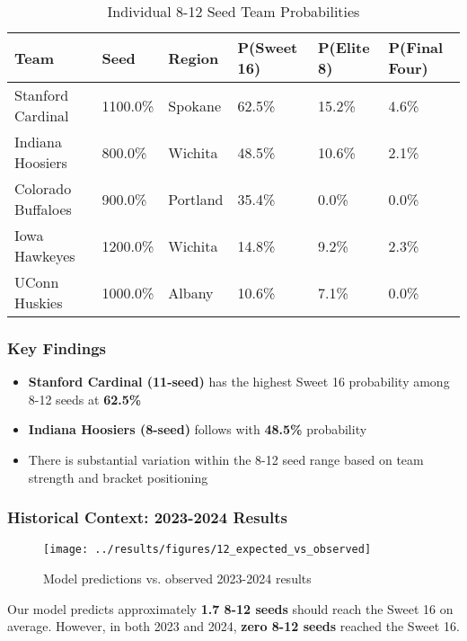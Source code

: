 \documentclass[
]{article}
\providecommand{\tightlist}{%
  \setlength{\itemsep}{0pt}\setlength{\parskip}{0pt}}
\begin{document}
\begin{longtable}[t]{llllll}
\caption{\label{tab:sweet16-team-table}Individual 8-12 Seed Team Probabilities}\\
\toprule
Team & Seed & Region & P(Sweet 16) & P(Elite 8) & P(Final Four)\\
\midrule
Stanford Cardinal & 1100.0\% & Spokane & 62.5\% & 15.2\% & 4.6\%\\
Indiana Hoosiers & 800.0\% & Wichita & 48.5\% & 10.6\% & 2.1\%\\
Colorado Buffaloes & 900.0\% & Portland & 35.4\% & 0.0\% & 0.0\%\\
Iowa Hawkeyes & 1200.0\% & Wichita & 14.8\% & 9.2\% & 2.3\%\\
UConn Huskies & 1000.0\% & Albany & 10.6\% & 7.1\% & 0.0\%\\
\bottomrule
\end{longtable}

\subsubsection{Key Findings}\label{key-findings-1}

\begin{itemize}
\tightlist
\item
  \textbf{Stanford Cardinal (11-seed)} has the highest Sweet 16
  probability among 8-12 seeds at \textbf{62.5\%}
\item
  \textbf{Indiana Hoosiers (8-seed)} follows with \textbf{48.5\%}
  probability
\item
  There is substantial variation within the 8-12 seed range based on
  team strength and bracket positioning
\end{itemize}

\subsubsection{Historical Context: 2023-2024
Results}\label{historical-context-2023-2024-results}

\begin{figure}

{\centering \texttt{[image: ../results/figures/12\_expected\_vs\_observed]} 

}

\caption{Model predictions vs. observed 2023-2024 results}\label{fig:historical-context-plot}
\end{figure}

Our model predicts approximately \textbf{1.7 8-12 seeds} should reach
the Sweet 16 on average. However, in both 2023 and 2024, \textbf{zero
8-12 seeds} reached the Sweet 16.
\end{document}
